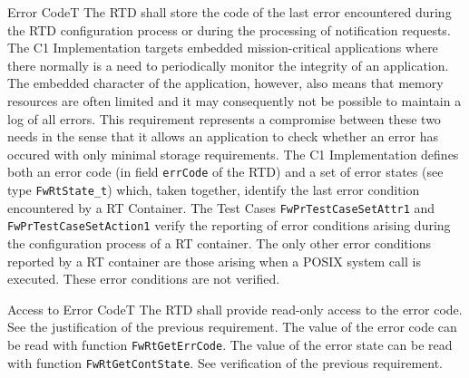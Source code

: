 \documentclass[a4paper,10pt]{article}
\newenvironment{fw_req}[6]
{\addtocounter{subsubsection}{1}
	\hspace{0.2cm}\textbf{FW-\arabic{section}.\arabic{subsection}.\arabic{subsubsection}/#2
	\hspace{0.8cm} #1}
	\vspace{-10pt}
\begin{longtable}{p{2.7cm}P{8.5cm}}
\hline
\textsc{Requirement} & #3 \\
\textsc{Justification} & #4 \\
\textsc{Implementation} & #5  \\ 
\textsc{Verification} & #6  \\
\hline
}
{\end{longtable}}
\begin{document}
\begin{fw_req}{Error Code}{T}
{The RTD shall store the code of the last error encountered during the RTD 
configuration process or during the processing of notification requests.}
{The C1 Implementation targets embedded mission-critical applications where there normally is a need to periodically monitor the integrity of an application. The embedded character of the application, however, also means that memory resources are often limited and it may consequently not be possible to maintain a log of all errors. This requirement represents a compromise between these two needs in the sense that it allows an application to check whether an error has occured with only minimal storage requirements.}
{The C1 Implementation defines both an error code (in field \texttt{errCode} of the RTD) and a set of error states (see type \texttt{FwRtState\_t}) which, taken together, identify the last error condition encountered by a RT Container.} 
{The Test Cases \texttt{FwPrTestCaseSetAttr1} and \texttt{FwPrTestCaseSetAction1} verify the reporting of error conditions arising during the configuration process of a RT container. The only other error conditions reported by a RT container are those arising when a POSIX system call is executed. These error conditions are not verified.}
\end{fw_req}


\begin{fw_req}{Access to Error Code}{T}
{The RTD shall provide read-only access to the error code.}
{See the justification of the previous requirement.}
{The value of the error code can be read with function \texttt{FwRtGetErrCode}. The value of the error state can be read with function \texttt{FwRtGetContState}.} 
{See verification of the previous requirement.}
\end{fw_req}
\end{document}
